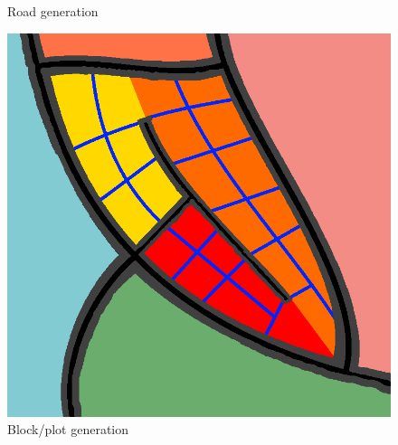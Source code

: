 \begin{figure}[H]
    \caption{Road generation}\label{fig:awesome_image2}
  \endminipage\hfill
    \includegraphics[width=\linewidth]{figure/method_generation_3.png}
    \caption{Block/plot generation}\label{fig:awesome_image3}
  \endminipage
\end{figure}
  






